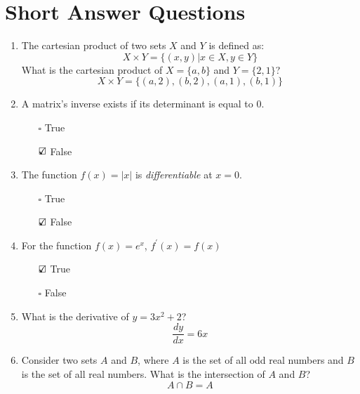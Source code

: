 \documentclass{./../../Latex/tests}
\begin{document}
\thispagestyle{plain}

\vspace{0.5em}

\section{Short Answer Questions}
\begin{enumerate}
\item The cartesian product of two sets $X$ and $Y$ is defined as: $$ X \times Y = \{(x,y) | x \in X, y \in Y\} $$
What is the cartesian product of $X=\{a,b\}$ and $Y=\{2,1\}$? \\
$$  X \times Y = \{ (a,2), (b,2), (a,1), (b,1) \} $$

\item A matrix's inverse exists if its determinant is equal to 0. 
\begin{itemize}
\item[$\square$] True 
\item[$\text{\rlap{$\checkmark$}}\square$] False \\
\end{itemize}

\item The function $f(x) = |x|$ is \textit{differentiable} at $x=0$.
\begin{itemize}
\item[$\square$] True 
\item[$\text{\rlap{$\checkmark$}}\square$] False \\
\end{itemize}

\item For the function $f(x) = e^x$, $f^{\prime} (x)=f(x)$ 
\begin{itemize}
\item[$\text{\rlap{$\checkmark$}}\square$] True 
\item[$\square$] False \\
\end{itemize}

\item What is the derivative of $y=3x^2+2$? \\  $$ \frac{dy}{dx} =6x$$

\item Consider two sets $A$ and $B$, where $A$ is the set of all odd real numbers and $B$ is the set of all real numbers. What is the intersection of $A$ and $B$? 
$$ A \cap B = A $$


\end{enumerate}
\end{document}

